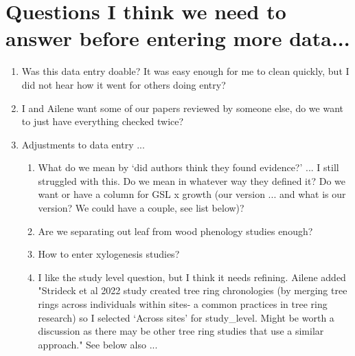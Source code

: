 \documentclass[11pt]{article}
\begin{document}
\section{Questions I think we need to answer before entering more data...}

\begin{enumerate}
\item Was this data entry doable? It was easy enough for me to clean quickly, but I did not hear how it went for others doing entry?
\item I and Ailene want some of our papers reviewed by someone else, do we want to just have everything checked twice?
\item Adjustments to data entry ...
\begin{enumerate}
\item What do we mean by `did authors think they found evidence?' ... I still struggled with this. Do we mean in whatever way they defined it? Do we want or have a column for GSL x growth (our version ... and what is our version? We could have a couple, see list below)? 
\item Are we separating out leaf from wood phenology studies enough?
\item How to enter xylogenesis studies?
\item I like the study level question, but I think it needs refining. Ailene added "Strideck et al 2022 study created tree ring chronologies (by merging tree rings across individuals within sites- a common practices in tree ring research) so I selected `Across sites' for study\_level. Might be worth a discussion as there may be other tree ring studies that use a similar approach." See below also ...
\end{enumerate}
\end{enumerate}
\end{document}
